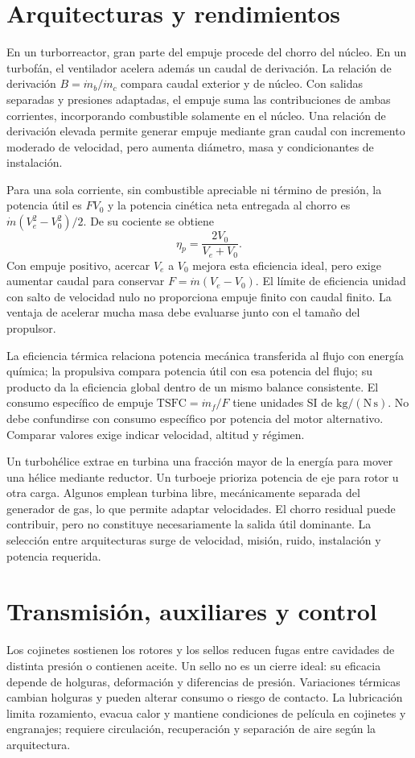 \section{Arquitecturas y rendimientos}
En un turborreactor, gran parte del empuje procede del chorro del núcleo. En un turbofán, el ventilador acelera además un caudal de derivación. La relación de derivación $B=\dot m_b/\dot m_c$ compara caudal exterior y de núcleo. Con salidas separadas y presiones adaptadas, el empuje suma las contribuciones de ambas corrientes, incorporando combustible solamente en el núcleo. Una relación de derivación elevada permite generar empuje mediante gran caudal con incremento moderado de velocidad, pero aumenta diámetro, masa y condicionantes de instalación.

Para una sola corriente, sin combustible apreciable ni término de presión, la potencia útil es $FV_0$ y la potencia cinética neta entregada al chorro es $\dot m(V_e^2-V_0^2)/2$. De su cociente se obtiene
\begin{equation}
 \eta_p=\frac{2V_0}{V_e+V_0}.
\end{equation}
Con empuje positivo, acercar $V_e$ a $V_0$ mejora esta eficiencia ideal, pero exige aumentar caudal para conservar $F=\dot m(V_e-V_0)$. El límite de eficiencia unidad con salto de velocidad nulo no proporciona empuje finito con caudal finito. La ventaja de acelerar mucha masa debe evaluarse junto con el tamaño del propulsor.

La eficiencia térmica relaciona potencia mecánica transferida al flujo con energía química; la propulsiva compara potencia útil con esa potencia del flujo; su producto da la eficiencia global dentro de un mismo balance consistente. El consumo específico de empuje $\mathrm{TSFC}=\dot m_f/F$ tiene unidades SI de $\mathrm{kg/(N\,s)}$. No debe confundirse con consumo específico por potencia del motor alternativo. Comparar valores exige indicar velocidad, altitud y régimen.

Un turbohélice extrae en turbina una fracción mayor de la energía para mover una hélice mediante reductor. Un turboeje prioriza potencia de eje para rotor u otra carga. Algunos emplean turbina libre, mecánicamente separada del generador de gas, lo que permite adaptar velocidades. El chorro residual puede contribuir, pero no constituye necesariamente la salida útil dominante. La selección entre arquitecturas surge de velocidad, misión, ruido, instalación y potencia requerida.

\section{Transmisión, auxiliares y control}
Los cojinetes sostienen los rotores y los sellos reducen fugas entre cavidades de distinta presión o contienen aceite. Un sello no es un cierre ideal: su eficacia depende de holguras, deformación y diferencias de presión. Variaciones térmicas cambian holguras y pueden alterar consumo o riesgo de contacto. La lubricación limita rozamiento, evacua calor y mantiene condiciones de película en cojinetes y engranajes; requiere circulación, recuperación y separación de aire según la arquitectura.

